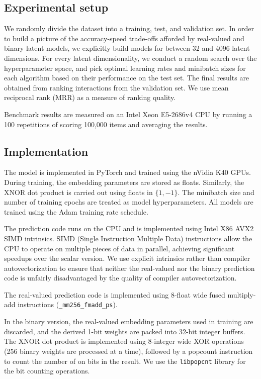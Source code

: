 \documentclass[sigchi]{acmart}
\begin{document}
\subsection{Experimental setup}
We randomly divide the dataset into a training, test, and validation set. In order to build a picture of the accuracy-speed trade-offs afforded by real-valued and binary latent models, we explicitly build models for between 32 and 4096 latent dimensions. For every latent dimensionality, we conduct a random search over the hyperparameter space, and pick optimal learning rates and minibatch sizes for each algorithm based on their performance on the test set. The final results are obtained from ranking interactions from the validation set. We use mean reciprocal rank (MRR) as a measure of ranking quality.

Benchmark results are measured on an Intel Xeon E5-2686v4 CPU by running a 100 repetitions of scoring 100,000 items and averaging the results.

\subsection{Implementation}
The model is implemented in PyTorch and trained using the nVidia K40 GPUs. During training, the embedding parameters are stored as floats. Similarly, the XNOR dot product is carried out using floats in $\{1, -1\}$. The minibatch size and number of training epochs are treated as model hyperparameters. All models are trained using the Adam training rate schedule. 

The prediction code runs on the CPU and is implemented using Intel X86 AVX2 SIMD intrinsics. SIMD (Single Instruction Multiple Data) instructions allow the CPU to operate on multiple pieces of data in parallel, achieving significant speedups over the scalar version. We use explicit intrinsics rather than compiler autovectorization to ensure that neither the real-valued nor the binary prediction code is unfairly disadvantaged by the quality of compiler autovectorization. 

The real-valued prediction code is implemented using 8-float wide fused multiply-add instructions (\texttt{\_mm256\_fmadd\_ps}).

In the binary version, the real-valued embedding parameters used in training are discarded, and the derived 1-bit weights are packed into 32-bit integer buffers. The XNOR dot product is implemented using 8-integer wide XOR operations (256 binary weights are processed at a time), followed by a popcount instruction to count the number of on bits in the result. We use the \texttt{libpopcnt} \citep{mula2016faster} library for the bit counting operations.
\end{document}
